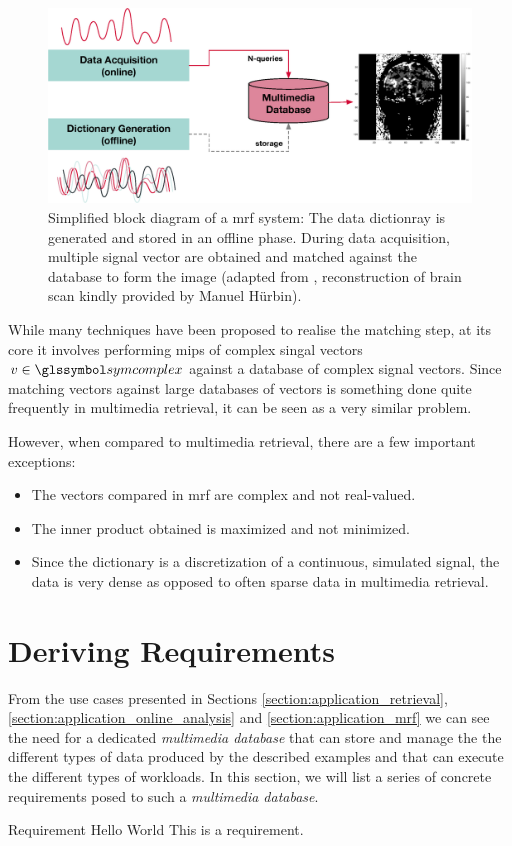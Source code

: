 \begin{figure}[tb]
    \centering
    \includegraphics[width=\textwidth]{figures/mrf.eps}
    \caption{Simplified block diagram of a \acrshort{mrf} system: The data dictionray is generated and stored in an offline phase. During data acquisition, multiple signal vector are obtained and matched against the database to form the image (adapted from \cite{Bipin:2019Magnetic}, reconstruction of brain scan kindly provided by Manuel Hürbin).}
    \label{figure:mrf}
\end{figure}

While many techniques have been proposed to realise the matching step, at its core it involves performing \acrfull{mips} of complex singal vectors $v \in \symcomplex$ against a database of complex signal vectors. Since matching vectors against large databases of vectors is something done quite frequently in multimedia retrieval, it can be seen as a very similar problem. 

However, when compared to multimedia retrieval, there are a few important exceptions: 

\begin{itemize}
    \item The vectors compared in \acrshort{mrf} are complex and not real-valued.
    \item The inner product obtained is maximized and not minimized.
    \item Since the dictionary is a discretization of a continuous, simulated signal, the data is very dense as opposed to often sparse data in multimedia retrieval.
\end{itemize}

\section{Deriving Requirements}
From the use cases presented in Sections \ref{section:application_retrieval}, \ref{section:application_online_analysis} and \ref{section:application_mrf} we can see the need for a dedicated \emph{multimedia database} that can store and manage the the different types of data produced by the described examples and that can execute the different types of workloads. In this section, we will list a series of concrete requirements posed to such a \emph{multimedia database}.

\begin{requirement}{Requirement Hello World}
    This is a requirement.
\end{requirement}